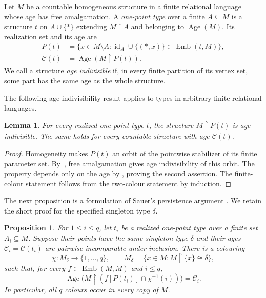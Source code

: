 \documentclass{article}
\numberwithin{equation}{section}
\newtheorem{lemma}[theorem]{Lemma}
\newtheorem{proposition}[theorem]{Proposition}
\theoremstyle{definition}
\DeclareMathOperator{\Emb}{Emb}
\DeclareMathOperator{\Age}{Age}
\newcommand{\res}{\mathbin{\upharpoonright}}
\begin{document}
Let $M$ be a countable homogeneous structure in a finite relational language
whose age has free amalgamation. A \emph{one-point type} over a finite
$A\subseteq M$ is a structure $t$ on $A\cup\{*\}$ extending $M\res A$
and belonging to $\Age(M)$. Its realization set and its age are
\begin{align*}
 P(t)&=\{x\in M\setminus A:
       \operatorname{id}_{A}\cup\{(*,x)\}\in\Emb(t,M)\},\\
 \mathcal C(t)&=\Age(M\res P(t)).
\end{align*}
We call a structure \emph{age indivisible} if, in every finite partition of
its vertex set, some part has the same age as the whole structure.

The following age-indivisibility result applies to types in arbitrary
finite relational languages.

\begin{lemma}\label{neg:age-indivisibility}
For every realized one-point type $t$, the structure $M\res P(t)$ is age
indivisible. The same holds for every countable structure with age
$\mathcal C(t)$.
\end{lemma}

\begin{proof}
Homogeneity makes $P(t)$ an orbit of the pointwise stabilizer of its
finite parameter set. By~\cite[Theorem~3.2 and Lemma~4.1]{SauerCanonicalVertex2003},
free amalgamation gives age indivisibility of this orbit.
The property depends only on the age by
\cite[Theorem~3.1]{SauerCanonicalVertex2003}, proving the second assertion.
The finite-colour statement follows from the two-colour statement by induction.
\end{proof}

The next proposition is a formulation of Sauer's persistence argument
\cite[Lemma~5.1 and Theorem~5.1]{SauerCanonicalVertex2003}. We retain the
short proof for the specified singleton type $\delta$.

\begin{proposition}\label{neg:persistence}
For $1\leq i\leq q$, let $t_i$ be a realized one-point type over a finite
set $A_i\subseteq M$. Suppose their points have the same singleton
type $\delta$ and their ages $\mathcal C_i=\mathcal C(t_i)$ are pairwise
incomparable under inclusion. There is a colouring
\[
 \chi:M_\delta\longrightarrow\{1,\ldots,q\},\qquad
 M_\delta=\{x\in M:M\res\{x\}\cong\delta\},
\]
such that, for every $f\in\Emb(M,M)$ and $i\le q$,
\begin{equation}\label{neg:persistent-age}
 \Age\bigl(M\res(f[P(t_i)]\cap\chi^{-1}(i))\bigr)=\mathcal C_i.
\end{equation}
In particular, all $q$ colours occur in every copy of $M$.
\end{proposition}
\end{document}
